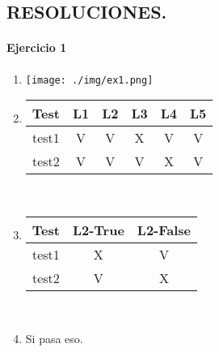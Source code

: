 \documentclass{article}
\begin{document}


\begin{center}
\section*{RESOLUCIONES.}
\end{center}

\paragraph{Ejercicio 1}

\begin{multicols}{2}
\begin{enumerate}
\item \texttt{[image: ./img/ex1.png]}
\item 
\begin{tabular}{|c|c|c|c|c|c|}
\hline 
Test & L1 & L2 & L3 & L4 & L5 \\ 
\hline 
test1 & V & V & X & V & V \\ 
\hline 
test2 & V & V & V & X & V \\ 
\hline 
\end{tabular} \bigskip\\
\item \begin{tabular}{|c|c|c|}
\hline 
Test & L2-True & L2-False \\ 
\hline 
test1 & X & V \\ 
\hline 
test2 & V & X \\ 
\hline 
\end{tabular}\bigskip\\
\item Si pasa eso.
\end{enumerate}
\end{multicols}
\end{document}

